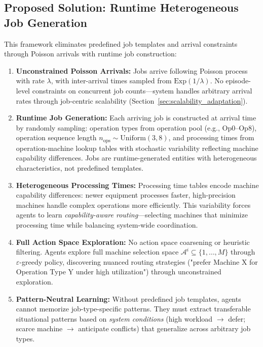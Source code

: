 \subsection{Proposed Solution: Runtime Heterogeneous Job Generation}

This framework eliminates predefined job templates and arrival constraints through Poisson arrivals with runtime job construction:

\begin{enumerate}
\item \textbf{Unconstrained Poisson Arrivals:} Jobs arrive following Poisson process with rate \( \lambda \), with inter-arrival times sampled from \( \text{Exp}(1/\lambda) \). No episode-level constraints on concurrent job counts—system handles arbitrary arrival rates through job-centric scalability (Section~\ref{sec:scalability_adaptation}).

\item \textbf{Runtime Job Generation:} Each arriving job is constructed at arrival time by randomly sampling: operation types from operation pool (e.g., Op0--Op8), operation sequence length \( n_{\text{ops}} \sim \text{Uniform}(3, 8) \), and processing times from operation-machine lookup tables with stochastic variability reflecting machine capability differences. Jobs are runtime-generated entities with heterogeneous characteristics, not predefined templates.

\item \textbf{Heterogeneous Processing Times:} Processing time tables encode machine capability differences: newer equipment processes faster, high-precision machines handle complex operations more efficiently. This variability forces agents to learn \textit{capability-aware routing}—selecting machines that minimize processing time while balancing system-wide coordination.

\item \textbf{Full Action Space Exploration:} No action space coarsening or heuristic filtering. Agents explore full machine selection space \( \mathcal{A}^i \subseteq \{1, \ldots, M\} \) through \( \varepsilon \)-greedy policy, discovering nuanced routing strategies ("prefer Machine X for Operation Type Y under high utilization") through unconstrained exploration.

\item \textbf{Pattern-Neutral Learning:} Without predefined job templates, agents cannot memorize job-type-specific patterns. They must extract transferable situational patterns based on \textit{system conditions} (high workload \( \rightarrow \) defer; scarce machine \( \rightarrow \) anticipate conflicts) that generalize across arbitrary job types.
\end{enumerate}


